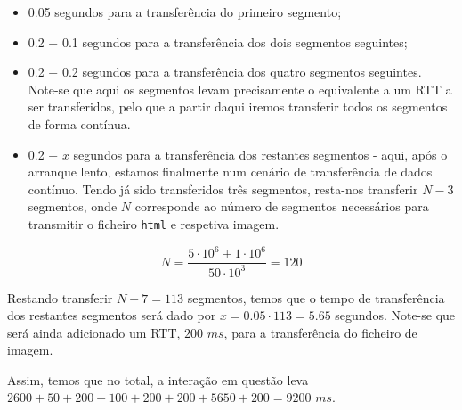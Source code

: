 \begin{enumerate}[leftmargin=\labelsep]
        \begin{itemize}
          \item 0.05 segundos para a transferência do primeiro segmento;
          \item 0.2 + 0.1 segundos para a transferência dos dois segmentos seguintes;
          \item 0.2 + 0.2 segundos para a transferência dos quatro segmentos seguintes.
                Note-se que aqui os segmentos levam precisamente o equivalente
                a um RTT a ser transferidos, pelo que a partir daqui iremos transferir
                todos os segmentos de forma contínua.
          \item 0.2 + $x$ segundos para a transferência dos restantes segmentos - aqui, após
                o arranque lento, estamos finalmente num cenário de transferência de dados
                contínuo. Tendo já sido transferidos três segmentos, resta-nos transferir $N-3$ segmentos,
                onde $N$ corresponde ao número de segmentos necessários para transmitir
                o ficheiro \texttt{html} e respetiva imagem.
        \end{itemize}


        $$
          N = \frac{5 \cdot 10^6 + 1 \cdot 10^6}{50 \cdot 10^3} = 120
        $$

        Restando transferir $N-7 = 113$ segmentos, temos que o tempo de transferência dos restantes
        segmentos será dado por $x = 0.05 \cdot 113 = 5.65$ segundos. Note-se que será ainda
        adicionado um RTT, $200$ $ms$, para a transferência do ficheiro de imagem.

        Assim, temos que no total, a interação em questão leva $2600 + 50 + 200 + 100 + 200 + 200 + 5650 + 200 = 9200$ $ms$.

\end{enumerate}